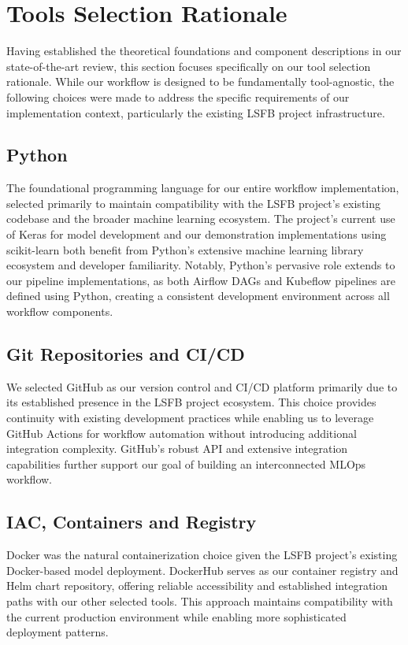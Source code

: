 \section{Tools Selection Rationale}\label{sec:tools2}
Having established the theoretical foundations and component descriptions in our state-of-the-art review, this section focuses specifically on our tool selection rationale.
While our workflow is designed to be fundamentally tool-agnostic, the following choices were made to address the specific requirements of our implementation context, particularly the existing LSFB project infrastructure.

\subsection{Python}\label{subsec:python}
The foundational programming language for our entire workflow implementation, selected primarily to maintain compatibility with the LSFB project's existing codebase and the broader machine learning ecosystem.
The project's current use of Keras for model development and our demonstration implementations using scikit-learn both benefit from Python's extensive machine learning library ecosystem and developer familiarity.
Notably, Python's pervasive role extends to our pipeline implementations, as both Airflow DAGs and Kubeflow pipelines are defined using Python, creating a consistent development environment across all workflow components.

\subsection{Git Repositories and CI/CD}\label{subsec:github}
We selected GitHub as our version control and CI/CD platform primarily due to its established presence in the LSFB project ecosystem.
This choice provides continuity with existing development practices while enabling us to leverage GitHub Actions for workflow automation without introducing additional integration complexity.
GitHub's robust API and extensive integration capabilities further support our goal of building an interconnected MLOps workflow.

\subsection{IAC, Containers and Registry}\label{subsec:dockerhub}
Docker was the natural containerization choice given the LSFB project's existing Docker-based model deployment.
DockerHub serves as our container registry and Helm chart repository, offering reliable accessibility and established integration paths with our other selected tools.
This approach maintains compatibility with the current production environment while enabling more sophisticated deployment patterns.


